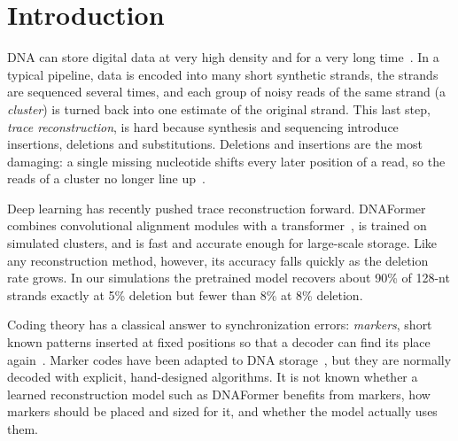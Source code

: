 
\section{Introduction}

DNA can store digital data at very high density and for a very long time~\cite{church2012,goldman2013,erlich2017,organick2018}.
In a typical pipeline, data is encoded into many short synthetic strands, the strands are sequenced several times, and each
group of noisy reads of the same strand (a \emph{cluster}) is turned back into one estimate of the original strand.
This last step, \emph{trace reconstruction}, is hard because synthesis and sequencing introduce insertions, deletions and
substitutions. Deletions and insertions are the most damaging: a single missing nucleotide shifts every later position
of a read, so the reads of a cluster no longer line up~\cite{sabary2024}.

Deep learning has recently pushed trace reconstruction forward. DNAFormer~\cite{barlev2025} combines convolutional
alignment modules with a transformer~\cite{vaswani2017}, is trained on simulated clusters, and is fast and accurate
enough for large-scale storage. Like any reconstruction method, however, its accuracy falls quickly as the deletion rate
grows. In our simulations the pretrained model recovers about 90\% of 128-nt strands exactly at 5\% deletion but fewer
than 8\% at 8\% deletion.

Coding theory has a classical answer to synchronization errors: \emph{markers}, short known patterns inserted at fixed
positions so that a decoder can find its place again~\cite{sellers1962,davey2001,ratzer2005}. Marker codes have been
adapted to DNA storage~\cite{tong2023,haghighat2025}, but they are normally decoded with explicit, hand-designed
algorithms. It is not known whether a learned reconstruction model such as DNAFormer benefits from markers, how markers
should be placed and sized for it, and whether the model actually uses them.

